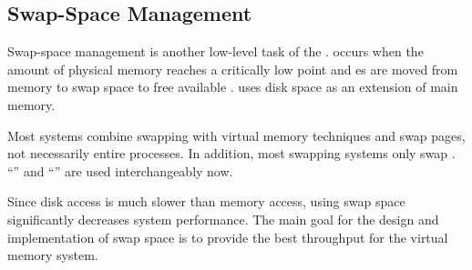 \subsection{Swap-Space Management}\label{subsec:Swap_Space_Management}
Swap-space management is another low-level task of the .
 occurs when the amount of physical memory reaches a critically low point and es are moved from memory to swap space to free available .
 uses disk space as an extension of main memory.

Most systems combine swapping with virtual memory techniques and swap pages, not necessarily entire processes.
In addition, most swapping systems only swap .
``'' and ``'' are used interchangeably now.

Since disk access is much slower than memory access, using swap space significantly decreases system performance.
The main goal for the design and implementation of swap space is to provide the best throughput for the virtual memory system.


